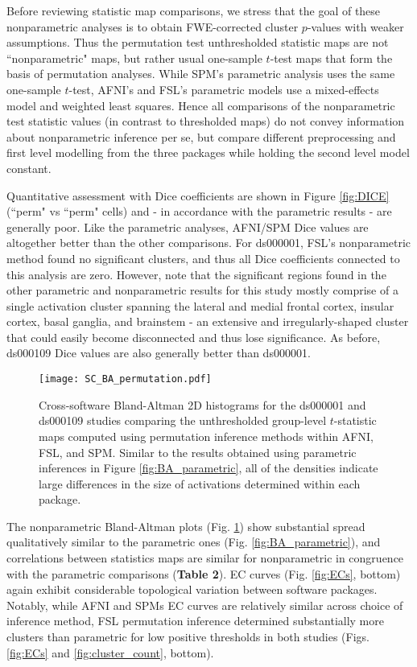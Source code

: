 Before reviewing statistic map comparisons, we stress that the goal of these nonparametric analyses is to obtain FWE-corrected cluster $p$-values with weaker assumptions. Thus the permutation test unthresholded statistic maps are not ``nonparametric" maps, but rather usual one-sample $t$-test maps that form the basis of permutation analyses. While SPM's parametric analysis uses the same one-sample $t$-test, AFNI's and FSL's parametric models use a mixed-effects model and weighted least squares. Hence all comparisons of the nonparametric test statistic values (in contrast to thresholded maps) do not convey information about nonparametric inference per se, but compare different preprocessing and first level modelling from the three packages while holding the second level model constant.

Quantitative assessment with Dice coefficients are shown in Figure \ref{fig:DICE} (``perm" vs ``perm" cells) and - in accordance with the parametric results - are generally poor. Like the parametric analyses, AFNI/SPM Dice values are altogether better than the other comparisons. For ds000001, FSL's nonparametric method found no significant clusters, and thus all Dice coefficients connected to this analysis are zero. However, note that the significant regions found in the other parametric and nonparametric results for this study mostly comprise of a single activation cluster spanning the lateral and medial frontal cortex, insular cortex, basal ganglia, and brainstem - an extensive and irregularly-shaped cluster that could easily become disconnected and thus lose significance. As before, ds000109 Dice values are also generally better than ds000001.

\begin{figure}[htbp]
\centering
	\texttt{[image: SC\_BA\_permutation.pdf]}	
\caption{Cross-software Bland-Altman 2D histograms for the ds000001 and ds000109 studies comparing the unthresholded group-level $t$-statistic maps computed using permutation inference methods within AFNI, FSL, and SPM. Similar to the results obtained using parametric inferences in Figure \ref{fig:BA_parametric}, all of the densities indicate large differences in the size of activations determined within each package.}
\label{fig:BA_permutation}
\end{figure}

The nonparametric Bland-Altman plots (Fig. \ref{fig:BA_permutation}) show substantial spread qualitatively similar to the parametric ones (Fig. \ref{fig:BA_parametric}), and correlations between statistics maps are similar for nonparametric in congruence with the parametric comparisons (\textbf{Table 2}). EC curves (Fig. \ref{fig:ECs}, bottom) again exhibit considerable topological variation between software packages. Notably, while AFNI and SPMs EC curves are relatively similar across choice of inference method, FSL permutation inference determined substantially more clusters than parametric for low positive thresholds in both studies (Figs. \ref{fig:ECs} and \ref{fig:cluster_count}, bottom).

